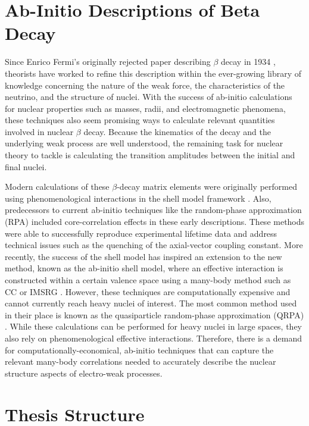 \documentclass[../thesis.tex]{subfiles}
\begin{document}
\section{Ab-Initio Descriptions of Beta Decay}

Since Enrico Fermi's originally rejected paper describing $\beta$ decay in 1934 \cite{FERMI1934,WILSON1968}, theorists have worked to refine this description within the ever-growing library of knowledge concerning the nature of the weak force, the characteristics of the neutrino, and the structure of nuclei.  With the success of ab-initio calculations for nuclear properties such as masses, radii, and electromagnetic phenomena, these techniques also seem promising ways to calculate relevant quantities involved in nuclear $\beta$ decay.  Because the kinematics of the decay and the underlying weak process are well understood, the remaining task for nuclear theory to tackle is calculating the transition amplitudes between the initial and final nuclei.

Modern calculations of these $\beta$-decay matrix elements were originally performed using phenomenological interactions in the shell model framework \cite{WILDENTHAL1983,BROWN1983,WARBURTON1992,ORMAND1995}.  Also, predecessors to current ab-initio techniques like the random-phase approximation (RPA) \cite{TOWNER1979} included core-correlation effects in these early descriptions.  These methods were able to successfully reproduce experimental lifetime data and address technical issues such as the quenching of the axial-vector coupling constant.  More recently, the success of the shell model has inspired an extension to the new method, known as the ab-initio shell model, where an effective interaction is constructed within a certain valence space using a many-body method such as CC \cite{JANSEN2014} or IMSRG \cite{BOGNER2014}.  However, these techniques are computationally expensive and cannot currently reach heavy nuclei of interest.  The most common method used in their place is known as the quasiparticle random-phase approximation (QRPA) \cite{SUHONEN2013153,ENGEL2015}.  While these calculations can be performed for heavy nuclei in large spaces, they also rely on phenomenological effective interactions.  Therefore, there is a demand for computationally-economical, ab-initio techniques that can capture the relevant many-body correlations needed to accurately describe the nuclear structure aspects of electro-weak processes.



\section{Thesis Structure}
\end{document}
